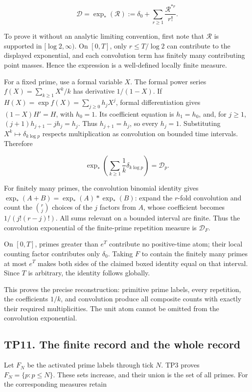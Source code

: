 \documentclass[
]{article}
\begin{document}
\[
\boxed{\mathcal D=\exp_*(\mathcal R)
:=\delta_0+\sum_{r\ge1}\frac{\mathcal R^{*r}}{r!}.}
\]

To prove it without an analytic limiting convention, first note that
\(\mathcal R\) is supported in \([\log2,\infty)\). On \([0,T]\), only
\(r\le T/\log2\) can contribute to the displayed exponential, and each
convolution term has finitely many contributing point masses. Hence the
expression is a well-defined locally finite measure.

For a fixed prime, use a formal variable \(X\). The formal power series
\(f(X)=\sum_{k\ge1}X^k/k\) has derivative \(1/(1-X)\). If
\(H(X)=\exp f(X)=\sum_{j\ge0}h_jX^j\), formal differentiation gives
\((1-X)H'=H\), with \(h_0=1\). Its coefficient equation is \(h_1=h_0\),
and, for \(j\ge1\), \((j+1)h_{j+1}-j h_j=h_j\). Thus \(h_{j+1}=h_j\), so
every \(h_j=1\). Substituting \(X^k\mapsto\delta_{k\log p}\) respects
multiplication as convolution on bounded time intervals. Therefore

\[
\exp_*\left(\sum_{k\ge1}\frac1k\delta_{k\log p}\right)=\mathcal D_p.
\]

For finitely many primes, the convolution binomial identity gives
\(\exp_*(A+B)=\exp_*(A)*\exp_*(B)\): expand the \(r\)-fold convolution
and count the \(\binom{r}{j}\) choices of the \(j\) factors from \(A\),
whose coefficient becomes \(1/(j!(r-j)!)\). All sums relevant on a
bounded interval are finite. Thus the convolution exponential of the
finite-prime repetition measure is \(\mathcal D_F\).

On \([0,T]\), primes greater than \(e^T\) contribute no positive-time
atom; their local counting factor contributes only \(\delta_0\). Taking
\(F\) to contain the finitely many primes at most \(e^T\) makes both
sides of the claimed boxed identity equal on that interval. Since \(T\)
is arbitrary, the identity follows globally.

This proves the precise reconstruction: primitive prime labels, every
repetition, the coefficients \(1/k\), and convolution produce all
composite counts with exactly their required multiplicities. The unit
atom cannot be omitted from the convolution exponential.

\subsection{TP11. The finite record and the whole
record}\label{tp11.-the-finite-record-and-the-whole-record}

Let \(F_N\) be the activated prime labels through tick \(N\). TP3 proves
\(F_N=\{p:p\le N\}\). These sets increase, and their union is the set of
all primes. For the corresponding measures retain
\end{document}

